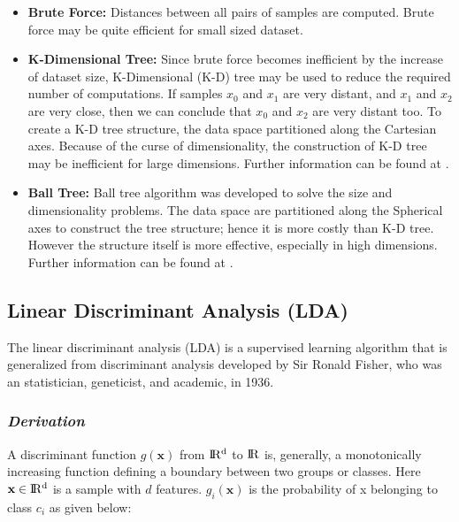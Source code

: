 \begin{itemize}
    \item \textbf{Brute Force:} Distances between all pairs of samples are computed. Brute force may be quite efficient for small sized dataset.
    
    \item \textbf{K-Dimensional Tree:} Since brute force becomes inefficient by the increase of dataset size, K-Dimensional (K-D) tree may be used to reduce the required number of computations. If samples $x_{0}$ and $x_{1}$ are very distant, and $x_{1}$ and $x_{2}$ are very close, then we can conclude that $x_{0}$ and $x_{2}$ are very distant too. To create a K-D tree structure, the data space partitioned along the Cartesian axes. Because of the curse of dimensionality, the construction of K-D tree may be inefficient for large dimensions. Further information can be found at \cite{kd_tree}.
    
    \item \textbf{Ball Tree:} Ball tree algorithm was developed to solve the size and dimensionality problems. The data space are partitioned along the Spherical axes to construct the tree structure; hence it is more costly than K-D tree. However the structure itself is more effective, especially in high dimensions. Further information can be found at \cite{ball_tree}.
    
\end{itemize}

\subsection{Linear Discriminant Analysis (LDA)}

The linear discriminant analysis (LDA) is a supervised learning algorithm that is generalized from discriminant analysis developed by Sir Ronald Fisher, who was an statistician, geneticist, and academic, in 1936.

\subsubsection*{\textit{Derivation}}

A discriminant function $g(\textbf{x})$ from $\rm I\!R^{d}$ to $\rm I\!R$ is, generally, a monotonically increasing function defining a boundary between two groups or classes. Here $\textbf{x} \in \rm I\!R^{d}$ is a sample with $d$ features. $g_{i}(\textbf{x})$ is the probability of x belonging to class $c_{i}$ as given below:

